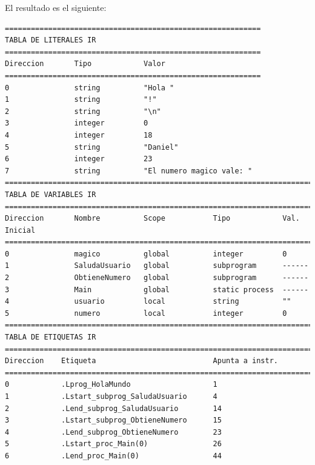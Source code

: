 \noindent
El resultado es el siguiente:
\begin{verbatim}
===========================================================
TABLA DE LITERALES IR
===========================================================
Direccion       Tipo            Valor           
===========================================================
0               string          "Hola "         
1               string          "!"             
2               string          "\n"            
3               integer         0               
4               integer         18              
5               string          "Daniel"        
6               integer         23              
7               string          "El numero magico vale: "
================================================================================
TABLA DE VARIABLES IR
================================================================================
Direccion       Nombre          Scope           Tipo            Val. Inicial    
================================================================================
0               magico          global          integer         0               
1               SaludaUsuario   global          subprogram      ------          
2               ObtieneNumero   global          subprogram      ------          
3               Main            global          static process  ------          
4               usuario         local           string          ""              
5               numero          local           integer         0               
================================================================================
TABLA DE ETIQUETAS IR
================================================================================
Direccion    Etiqueta                           Apunta a instr.
================================================================================
0            .Lprog_HolaMundo                   1
1            .Lstart_subprog_SaludaUsuario      4
2            .Lend_subprog_SaludaUsuario        14
3            .Lstart_subprog_ObtieneNumero      15
4            .Lend_subprog_ObtieneNumero        23
5            .Lstart_proc_Main(0)               26
6            .Lend_proc_Main(0)                 44


\end{verbatim}

